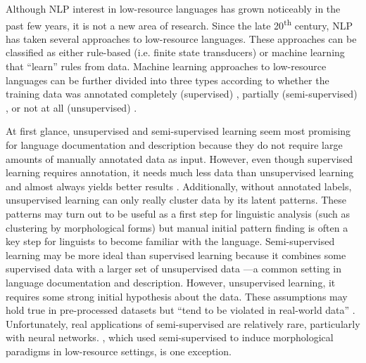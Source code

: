 Although NLP interest in low-resource languages has grown noticeably in the past few years, it is not a new area of research. Since the late 20\textsuperscript{th} century, NLP has taken several approaches to low-resource languages. These approaches can be classified as either rule-based (i.e. finite state transducers) \citep{cotterell_labeled_2015,forsberg_learning_2016,moeller_neural_2018,moeller_improving_2019} or machine learning that ``learn'' rules from data. Machine learning approaches to low-resource languages can be further divided into three types according to whether the training data was annotated completely (supervised) \citep{bergmanis_training_2017,sudhakar_experiments_2017,makarov_align_2017,liu_morphological_2018,makarov_uzh_2018}, partially (semi-supervised) \citep{ahlberg_semi-supervised_2014}, or not at all (unsupervised) \citep{moon_unsupervised_2009,palmer_computational_2010,kirschenbaum_unsupervised_2012,soricut_unsupervised_2015}. 

At first glance, unsupervised and semi-supervised learning seem most promising for language documentation and description because they do not require large amounts of manually annotated data as input. However, even though supervised learning requires annotation, it needs much less data than unsupervised learning and almost always yields better results \citep{ruokolainen_supervised_2013,cotterell_labeled_2015}. Additionally, without annotated labels, unsupervised learning can only really cluster data by its latent patterns. These patterns may turn out to be useful as a first step for linguistic analysis (such as clustering by morphological forms) but manual initial pattern finding is often a key step for linguists to become familiar with the language. Semi-supervised learning may be more ideal than supervised learning 
because it combines some supervised data with a larger set of unsupervised data \citep{kohonen_semi-supervised_2010,poon_unsupervised_2009}---a common setting in language documentation and description. However, unsupervised learning, it requires some strong initial hypothesis about the data. These assumptions may hold true in pre-processed datasets but ``tend to be violated in real-world data'' \citep{druck_reducing_2007}. Unfortunately, real applications of semi-supervised are relatively rare, particularly with neural networks. \cite{ahlberg_semi-supervised_2014}, which used semi-supervised to induce morphological paradigms in low-resource settings, is one exception. 

